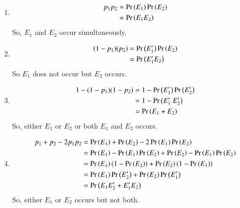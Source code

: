 \begin{enumerate}
\item \begin{align}
p_1p_2&=\Pr\left(E_1\right)\Pr\left(E_2\right)\\
&=\Pr\left(E_1E_2\right)
\end{align}
So, $E_1$ and $E_2$ occur simultaneously.
\item \begin{align}
(1 - p_1)(p_2) &= \Pr\left(E_1^\prime\right)\Pr\left(E_2\right) \\
&= \Pr\left({E_1^\prime}E_2\right)
\end{align}
So $E_1$ does not occur but $E_2$  occurs.
\item \begin{align}
1 - (1 - p_1)(1 - p_2) &= 1 - \Pr\left(E_1^\prime\right) \Pr\left(E_2^\prime\right) \\
&= 1 - \Pr\left(E_1^\prime \ E_2^\prime\right) \\
&= \Pr\left(E_1+E_2\right) 
\end{align}
So, either $E_1$ or $E_2$ or both $E_1$ and $E_2$  occurs.
\item \begin{align}
p_1 + p_2 - 2p_1p_2 &= \Pr\left(E_1\right) + \Pr\left(E_2\right) - 2\Pr\left(E_1\right) \Pr\left(E_2\right) \\
&=  \Pr\left(E_1\right)-\Pr\left(E_1\right)\Pr\left(E_2\right)+ \Pr\left(E_2\right) - \Pr\left(E_1\right) \Pr\left(E_2\right)\\
&= \Pr\left(E_1\right)\left(1-\Pr\left(E_2\right)\right)+\Pr\left(E_2\right) \left(1-\Pr\left(E_1\right)\right)\\
&=\Pr\left(E_1\right)\Pr\left(E_2^\prime\right)+\Pr\left(E_2\right)\Pr\left(E_1^\prime\right)\\
&=\Pr\left(E_1E_2^\prime+E_1^\prime E_2\right)
\end{align}
So, either $E_1$ or $E_2$ occurs but not both.
\end{enumerate}



